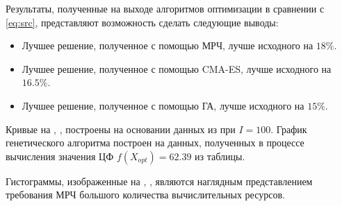 Результаты, полученные на выходе алгоритмов оптимизации в сравнении с \eqref{eq:src}, представляют возможность сделать следующие выводы:
\begin{itemize}
	\item Лучшее решение, полученное с помощью МРЧ, лучше исходного на $18 \%$.
	\item Лучшее решение, полученное с помощью CMA-ES, лучше исходного на $ 16.5\%$.
	\item Лучшее решение, полученное с помощью ГА, лучше исходного на $ 15\%$.
\end{itemize}


Кривые на , ,  построены на основании данных из  при $I = 100$. График генетического алгоритма построен на данных, полученных в процессе вычисления значения ЦФ $f(X_{opt}) = 62.39$ из таблицы.

Гистограммы, изображенные на , , являются наглядным представлением требования МРЧ большого количества вычислительных ресурсов.



%
